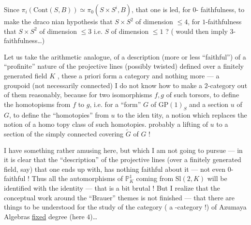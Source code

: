 Since $\pi_i(\mathrm{Cont}(S,B))\simeq
\pi_0(S\times S^i,B)$,
 
that one is led, for $0$-%
faithfulness, to make the draco%
nian hypothesis that $S\times S^2$ of dimension $\leq4$, for
$1$-faithfulness that $S\times S^2$ of dimension $\leq3$ i.e. $S$
of dimension $\leq1$ ? ( would then imply
$3$-faithfulness\ldots)

Let us take the arithmetic analogue, of a description
(more or less ``faithful'') 
of a ``profinite'' nature
of the projective lines  (possibly
twisted) defined over a finitely generated
field $K$ ,
these a priori form a category
and nothing more --- a groupoid (not necessarily
connected) I do not know how to make a
$2$-category out of them reasonably, because for two
isomorphisms $f,g$  of such torsors, to define the
homotopisms from $f$ to $g$, i.e. for a ``form''
$G$ of $\mathrm{GP}(1)_S$ and a section $u$ of $G$,
to define the ``homotopies'' from $u$ to the iden%
tity, 
 a
notion which replaces the notion of a homo%
topy class of such homotopies.  
probably a lifting of $u$ to a
section of the 
simply
connected covering $\widetilde G$ of $G$ !

I have something rather amusing here,
but which I am not going to pursue --- in
 it is clear that the ``description''
of the projective lines (over a finitely generated
field, say) that one ends up with,
has nothing faithful about it --- not even $0$-faithful !
Thus all the automorphisms of $\mathbb P^1_K$ coming from
$\mathrm{Sl}(2,K)$ will be identified with the identity ---
that is a bit brutal ! But I
realize that the conceptual work
around the ``Brauer'' themes is not
finished --- that there are things to be understood
for the study of the category
( a -category !)
of Azumaya Algebras
 \uline{fixed} degree (here $4$)\ldots
{}